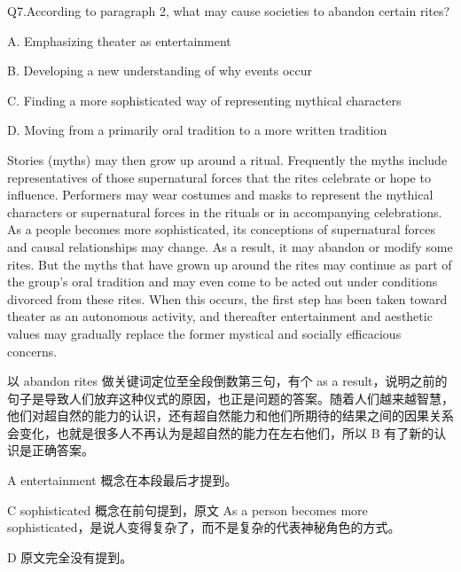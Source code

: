 \begin{blk}
    \begin{qst}
        Q7.According to paragraph 2, what may cause societies to abandon certain rites?
    \end{qst}

    \begin{chc}
        A. Emphasizing theater as entertainment

        B. Developing a new understanding of why events occur

        C. Finding a more sophisticated way of representing mythical characters

        D. Moving from a primarily oral tradition to a more written tradition
    \end{chc}

    \begin{psgq}
        Stories (myths) may then grow up around a ritual. Frequently the myths include representatives of those supernatural forces that the rites celebrate or hope to influence. Performers may wear costumes and masks to represent the mythical characters or supernatural forces in the rituals or in accompanying celebrations. As a people becomes more sophisticated, its conceptions of supernatural forces and causal relationships may change. As a result, it may abandon or modify some rites. But the myths that have grown up around the rites may continue as part of the group’s oral tradition and may even come to be acted out under conditions divorced from these rites. When this occurs, the first step has been taken toward theater as an autonomous activity, and thereafter entertainment and aesthetic values may gradually replace the former mystical and socially efficacious concerns.
    \end{psgq}

    \begin{nlz}
        以 abandon rites 做关键词定位至全段倒数第三句，有个 as a result，说明之前的句子是导致人们放弃这种仪式的原因，也正是问题的答案。随着人们越来越智慧，他们对超自然的能力的认识，还有超自然能力和他们所期待的结果之间的因果关系会变化，也就是很多人不再认为是超自然的能力在左右他们，所以 B 有了新的认识是正确答案。

        A entertainment 概念在本段最后才提到。

        C sophisticated 概念在前句提到，原文 As a person becomes more sophisticated，是说人变得复杂了，而不是复杂的代表神秘角色的方式。

        D 原文完全没有提到。
    \end{nlz}
\end{blk}

